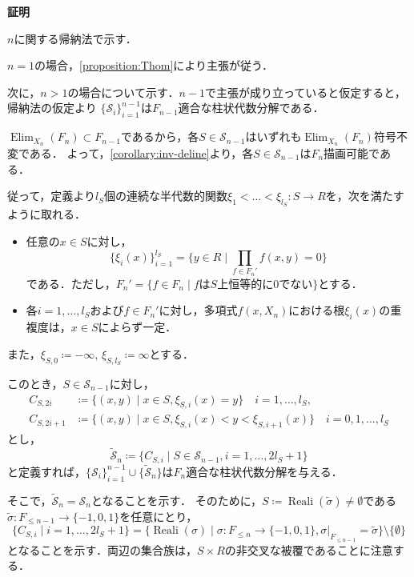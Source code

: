 \documentclass[uplatex, dvipdfmx]{jsarticle}
\makeatletter
\numberwithin{equation}{section}
\renewenvironment{proof}[1][\proofname]{\par
  \pushQED{\qed}%
  \normalfont \topsep6\p@\@plus6\p@\relax
  \trivlist
  \item\relax
  {\bfseries
  #1\@addpunct{.}}\hspace\labelsep\ignorespaces
}{
  \popQED\endtrivlist\@endpefalse
}
\newcommand{\map}[3]{{#1}\colon{#2}\rightarrow{#3}}
\DeclareMathOperator{\Elim}{Elim}
\DeclareMathOperator{\Reali}{Reali}
\theoremstyle{definition}
\renewcommand{\proofname}{\textbf{証明}}
\makeatother
\begin{document}
\begin{proof}
     $n$に関する帰納法で示す．

     $n=1$の場合，\cref{proposition:Thom}により主張が従う．

     次に，$n>1$の場合について示す．$n-1$で主張が成り立っていると仮定すると，帰納法の仮定より
     $\{\mathcal{S}_{i}\}_{i=1}^{n-1}$は$F_{n-1}$適合な柱状代数分解である．

     $\Elim_{X_n}(F_n) \subset F_{n-1}$であるから，各$S \in \mathcal{S}_{n-1}$はいずれも$\Elim_{X_n}(F_n)$符号不変である．
     よって，\cref{corollary:inv-deline}より，各$S \in \mathcal{S}_{n-1}$は$F_n$描画可能である．

     従って，定義より$l_S$個の連続な半代数的関数$\map{\xi_1<\dots<\xi_{l_S}}{S}{R}$を，次を満たすように取れる．
     \begin{itemize}
          \item 任意の$ x \in S $に対し，
          \begin{equation}
               \{\xi_i(x)\}_{i=1}^{l_S} = \{y \in R \mid \prod_{f \in F_n'}f(x,y)=0\}
          \end{equation}
          である．ただし，$F_n' = \{f \in F_n \mid \text{$f$は$S$上恒等的に$0$でない}\}$とする．
          \item 各$i=1, \dots, l_S$および$f \in F_n'$に対し，多項式$f(x,X_n)$における根$\xi_i(x)$の重複度は，$x\in S$によらず一定．
     \end{itemize}
     また，$\xi_{S,0} \coloneqq -\infty$, $\xi_{S,l_S} \coloneqq \infty$とする．

     このとき，$S \in \mathcal{S}_{n-1}$に対し，
     \begin{align}
          C_{S,2i} &\coloneqq \{(x,y) \mid  x \in S, \xi_{S,i}(x) = y \} \quad i = 1,\dots, l_S,\\
          C_{S,2i+1} &\coloneqq \{(x,y) \mid x \in S, \xi_{S,i}(x)<y<\xi_{S,i+1}(x) \} \quad i = 0,1, \dots, l_S 
     \end{align}
     とし，
     \begin{equation}
          \widetilde{\mathcal{S}}_n \coloneqq \{C_{S,i} \mid S \in \mathcal{S}_{n-1}, i=1, \dots, 2l_S+1 \}
     \end{equation}
     と定義すれば，$\{\mathcal{S}_i\}_{i=1}^{n-1} \cup \{\widetilde{\mathcal{S}}_n\}$は$F_n$適合な柱状代数分解を与える．

     そこで，$\widetilde{\mathcal{S}}_n = \mathcal{S}_n$となることを示す．
     そのために，$S\coloneqq \Reali(\widetilde{\sigma}) \neq \emptyset$である$\map{\widetilde{\sigma}}{F_{\leq n-1}}{\{-1,0,1\}}$を任意にとり，
     \begin{equation}
          \{C_{S,i} \mid i=1, \dots, 2l_S + 1\} = \{\Reali(\sigma) \mid \map{\sigma}{F_{\leq n}}{\{-1,0,1\}}, \sigma|_{F_{\leq n-1}} = \widetilde{\sigma}\} \setminus \{\emptyset\}
     \end{equation}
     となることを示す．両辺の集合族は，$S \times R$の非交叉な被覆であることに注意する．


\end{proof}
\end{document}

